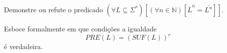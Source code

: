 \begin{questao}\label{exer:LF6}
	Demonstre ou refute o predicado $(\forall L \subseteq \Sigma^*)[(\forall n \in \mathbb{N})[\overline{L}^n = \overline{L^n}]]$.
\end{questao}

\begin{questao}\label{exer:LF7}
	Esboce formalmente em que condições a igualdade 
	$$PRE(L) = (SUF(L))^r$$ 
	é verdadeira.
\end{questao}
